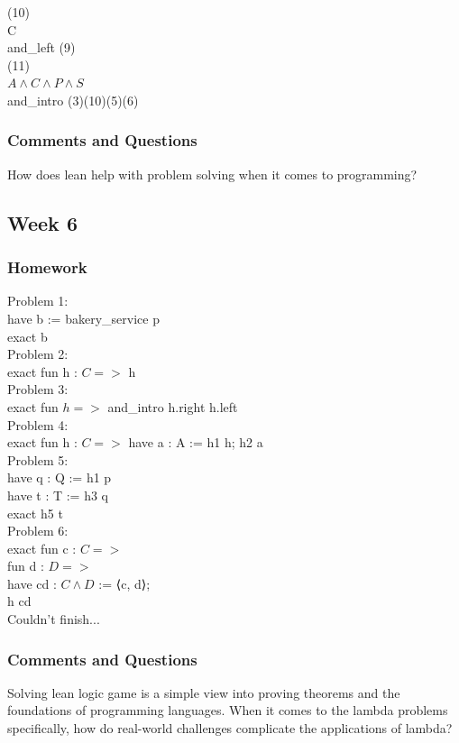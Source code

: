 \documentclass{article}
\theoremstyle{theorem}
\theoremstyle{definition}
\theoremstyle{remark}
\begin{document}
(10)\\
C\\
and\_left (9)\\

(11)\\
$A \land C \land P \land S$\\
and\_intro (3)(10)(5)(6)\\

\subsubsection*{Comments and Questions}
How does lean help with problem solving when it comes to programming?\\

\subsection{Week 6}
\subsubsection*{Homework}
Problem 1:\\
have b := bakery\_service p\\
exact b\\

Problem 2:\\
exact fun h : $C =>$ h\\

Problem 3:\\
exact fun $h =>$ and\_intro h.right h.left\\

Problem 4:\\
exact fun h : $C =>$ have a : A := h1 h; h2 a\\

Problem 5:\\
have q : Q := h1 p\\
have t : T := h3 q\\
exact h5 t\\
               
Problem 6:\\
exact fun c : $C =>$\\
  fun d : $D =>$\\
    have cd : $C \land D$ := ⟨c, d⟩;\\
    h cd    \\
    
Couldn't finish...

\subsubsection*{Comments and Questions}
Solving lean logic game is a simple view into proving theorems and the foundations of programming languages. When it comes to the lambda problems specifically, how do real-world challenges complicate the applications of lambda?
\end{document}
